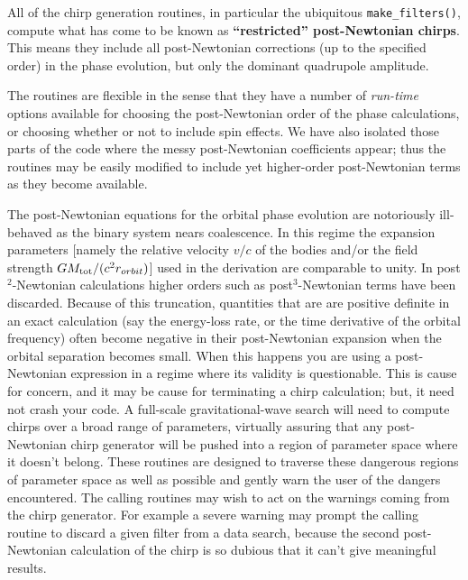 All of the chirp generation routines, 
in particular the ubiquitous {\tt make\_filters()}, 
compute what has come to be
known as {\bf  ``restricted'' post-Newtonian chirps}.
This means they include all post-Newtonian corrections
(up to the specified order)
in the phase evolution, but only the dominant quadrupole
amplitude.

The routines are flexible in the sense that they have a number
of {\it run-time} options available for choosing the post-Newtonian
order of the phase calculations, or choosing whether or not
to include spin effects.
We have also isolated those parts of the code where the messy
post-Newtonian coefficients appear;
thus the routines may be
easily modified to include yet higher-order post-Newtonian terms as
they become available.

The post-Newtonian equations for the orbital phase evolution are
notoriously ill-behaved \cite{cutleretal,lincolnwill} as the binary
system nears coalescence.  In this regime the expansion parameters
[namely the relative velocity $v/c$ of the bodies and/or the field
strength $GM_{\rm tot}/(c^2 r_{orbit})$] used in the derivation are
comparable to unity.  In post$^2$-Newtonian calculations higher orders
such as post$^3$-Newtonian terms have been discarded.  Because of this
truncation, quantities that are are positive definite in an exact
calculation (say the energy-loss rate, or the time derivative of the
orbital frequency) often become negative in their post-Newtonian
expansion when the orbital separation becomes small.  When this happens
you are using a post-Newtonian expression in a regime where its
validity is questionable.  This is cause for concern, and it may be
cause for terminating a chirp calculation; but, it need not crash your
code.  A full-scale gravitational-wave search will need to compute
chirps over a broad range of parameters, virtually assuring that any
post-Newtonian chirp generator will be pushed into a region of
parameter space where it doesn't belong.  These routines are designed
to traverse these dangerous regions of parameter space as well as
possible and gently warn the user of the dangers encountered.  The
calling routines may wish to act on the warnings coming from the chirp
generator.  For example a severe warning may prompt the calling routine
to discard a given filter from  a data search, because the second
post-Newtonian calculation of the chirp is so dubious that it can't
give meaningful results.

